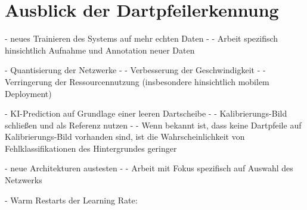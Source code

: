 

\section{Ausblick der Dartpfeilerkennung}
\label{sec:ausblick_ki}

- neues Trainieren des Systems auf mehr echten Daten
- - Arbeit spezifisch hinsichtlich Aufnahme und Annotation neuer Daten

- Quantisierung der Netzwerke
- - Verbesserung der Geschwindigkeit
- - Verringerung der Ressourcennutzung (insbesondere hinsichtlich mobilem Deployment)

- KI-Prediction auf Grundlage einer leeren Dartscheibe
- - Kalibrierungs-Bild schließen und als Referenz nutzen
- - Wenn bekannt ist, dass keine Dartpfeile auf Kalibrierungs-Bild vorhanden sind, ist die Wahrscheinlichkeit von Fehlklassifikationen des Hintergrundes geringer

- neue Architekturen austesten
- - Arbeit mit Fokus spezifisch auf Auswahl des Netzwerks

- Warm Restarts der Learning Rate: \cite{lr_warm_restart}


